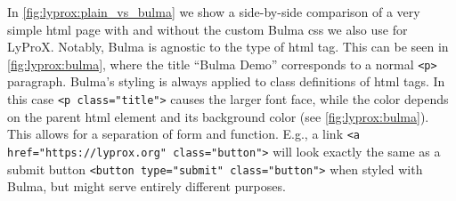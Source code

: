 \documentclass[\relativeRoot/main.tex]{subfiles}
\begin{document}
In \cref{fig:lyprox:plain_vs_bulma} we show a side-by-side comparison of a very simple \acrshort{html} page with and without the custom Bulma \acrshort{css} we also use for LyProX. Notably, Bulma is agnostic to the type of \acrshort{html} tag. This can be seen in \cref{fig:lyprox:bulma}, where the title ``Bulma Demo'' corresponds to a normal \texttt{<p>} paragraph. Bulma's styling is always applied to class definitions of \acrshort{html} tags. In this case \texttt{<p class="title">} causes the larger font face, while the color depends on the parent \acrshort{html} element and its background color (see \cref{fig:lyprox:bulma}). This allows for a separation of form and function. E.g., a link \texttt{<a href="https://lyprox.org" class="button">} will look exactly the same as a submit button \texttt{<button type="submit" class="button">} when styled with Bulma, but might serve entirely different purposes.
\end{document}
